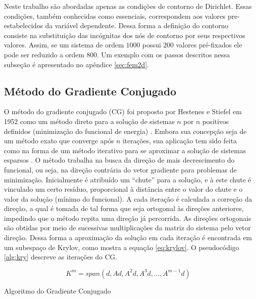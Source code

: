 \documentclass[
    12pt,               %
    openright,          %
    oneside,
    a4paper,            %
    english,            %
    french,             %
    spanish,            %
    brazil              %
    ]{abntex2}
\begin{document}
Neste trabalho são abordadas apenas as condições de contorno de Dirichlet. Essas condições, também conhecidas como essenciais, correspondem aos valores pre-estabelecidos da variável dependente. Dessa forma a definição do contorno consiste na substituição das incógnitas dos nós de contorno por seus respectivos valores. Assim, se um sistema de ordem $1000$ possui $200$ valores pré-fixados ele pode ser reduzido a ordem $800$. Um exemplo com os passos descritos nessa subseção é apresentado no apêndice \ref{sec:fem2d}.

\subsection{Método do Gradiente Conjugado}
\label{sec:CG}
O método do gradiente conjugado (CG) foi proposto por Hestenes e Stiefel em 1952 como um método direto para a solução de sistemas $n$ por $n$ positivos definidos (minimização do funcional de energia) \cite{burdenFaires}.
Embora sua concepção seja de um método exato que converge após $n$ iterações, sua aplicação tem sido feita como na forma de um método iterativo para se aproximar a solução de sistemas esparsos  \cite{Barrett1995}.
O método trabalha na busca da direção de mais decrescimento do funcional, ou seja, na direção contrária do vetor gradiente para problemas de minimização. Inicialmente é atribuído um ``chute'' para a solução, e à este chute é vinculado um certo resíduo, proporcional à distância entre o valor do chute e o valor da solução (mínimo do funcional). A cada iteração é calculada a correção da direção, a qual é tomada de tal forma que seja ortogonal às direções anteriores, impedindo que o método repita uma direção já percorrida. As direções ortogonais são obtidas por meio de sucessivas multiplicações da matriz do sistema pelo vetor direção. Dessa forma a aproximação da solução em cada iteração é encontrada em um subespaço de Krylov, como mostra a equação \ref{eq:krylov}. O pseudocódigo \ref{alg:kry} descreve as iterações do CG.

\begin{equation}
\label{eq:krylov}
K^m = span(d, Ad, A^2d, A^3d, ..., A^{m-1}d)
\end{equation}

\begin{algorithm}	
	\caption{\label{alg:kry}Algoritmo do Gradiente Conjugado} 
	\begin{algorithmic}[1]
		\EndIf
		\EndFor
	\end{algorithmic}
\end{algorithm}
\end{document}
